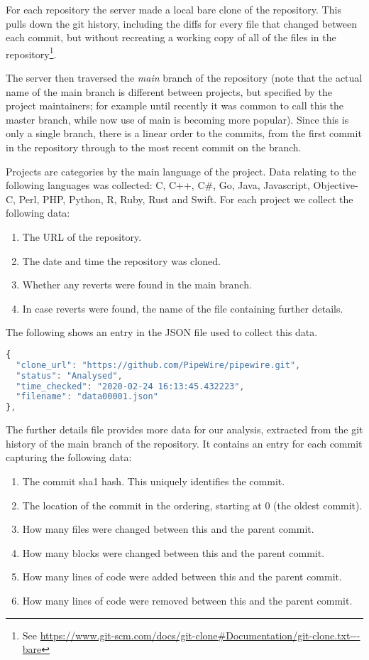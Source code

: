 \documentclass[10pt,journal,compsoc]{IEEEtran}
\begin{document}
For each repository the server made a local bare clone of the repository. This pulls down the git history, including the diffs for every file that changed between each commit, but without recreating a working copy of all of the files in the repository\footnote{See \url{https://www.git-scm.com/docs/git-clone#Documentation/git-clone.txt---bare}}.

The server then traversed the {\it main\/} branch of the repository (note that the actual name of the main branch is different between projects, but specified by the project maintainers; for example until recently it was common to call this the {\code master} branch, while now use of {\code main} is becoming more popular). Since this is only a single branch, there is a linear order to the commits, from the first commit in the repository through to the most recent commit on the branch.

Projects are categories by the main language of the project. Data relating to the following languages was collected: C, C++, C\#, Go, Java, Javascript, Objective-C, Perl, PHP, Python, R, Ruby, Rust and Swift. For each project we collect the following data:

\begin{enumerate}
\item The URL of the repository.
\item The date and time the repository was cloned.
\item Whether any reverts were found in the main branch.
\item In case reverts were found, the name of the file containing further details.
\end{enumerate}

The following shows an entry in the JSON file used to collect this data.

\begin{lstlisting}[language=JavaScript]
{
  "clone_url": "https://github.com/PipeWire/pipewire.git",
  "status": "Analysed",
  "time_checked": "2020-02-24 16:13:45.432223",
  "filename": "data00001.json"
},
\end{lstlisting}

The further details file provides more data for our analysis, extracted from the git history of the main branch of the repository. It contains an entry for each commit capturing the following data:

\begin{enumerate}
\item The commit sha1 hash. This uniquely identifies the commit.
\item The location of the commit in the ordering, starting at 0 (the oldest commit).
\item How many files were changed between this and the parent commit.
\item How many blocks were changed between this and the parent commit.
\item How many lines of code were added between this and the parent commit.
\item How many lines of code were removed between this and the parent commit.
\end{enumerate}
\end{document}
